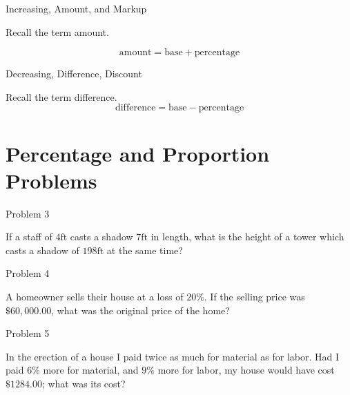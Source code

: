 \documentclass[]{beamer}
\begin{document}
\begin{frame}{Increasing, Amount, and Markup}

    Recall the term amount.  
    
    \[
        \mathrm{amount} = \mathrm{base} + \mathrm{percentage}
    \]
\end{frame}

\begin{frame}{Decreasing, Difference, Discount}

Recall the term difference.  
\[
    \mathrm{difference} = \mathrm{base} - \mathrm{percentage}
\]
\end{frame}


\section{Percentage and Proportion Problems}

\begin{frame}{Problem 3}

  If a staff of $4\mathrm{ft}$ casts a shadow $7\mathrm{ft}$ in length, what is the height of a tower which casts a shadow of $198\mathrm{ft}$ at the same time? 

\end{frame}

\begin{frame}{Problem 4}

  A homeowner sells their house at a loss of $20\%$.  If the selling price was 
  $\$60,000.00$, what was the original price of the home?

\end{frame}

\begin{frame}{Problem 5}

  In the erection of a house I paid twice as much for material
  as for labor.  Had I paid $6\%$ more for material, and $9\%$ more
  for labor, my house would have cost $\$1284.00$; what was its
  cost?
\end{frame}
\end{document}
